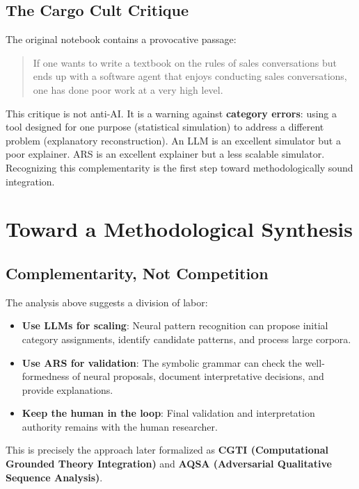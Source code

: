 \documentclass[12pt,a4paper]{article}
\begin{document}
\subsection{The Cargo Cult Critique}

The original notebook contains a provocative passage:

\blockquote{If one wants to write a textbook on the rules of sales conversations 
but ends up with a software agent that enjoys conducting sales conversations, 
one has done poor work at a very high level.}

This critique is not anti-AI. It is a warning against \textbf{category errors}: 
using a tool designed for one purpose (statistical simulation) to address a 
different problem (explanatory reconstruction). An LLM is an excellent simulator 
but a poor explainer. ARS is an excellent explainer but a less scalable 
simulator. Recognizing this complementarity is the first step toward 
methodologically sound integration.

\section{Toward a Methodological Synthesis}

\subsection{Complementarity, Not Competition}

The analysis above suggests a division of labor:

\begin{itemize}
    \item \textbf{Use LLMs for scaling}: Neural pattern recognition can propose 
    initial category assignments, identify candidate patterns, and process 
    large corpora.
    \item \textbf{Use ARS for validation}: The symbolic grammar can check the 
    well-formedness of neural proposals, document interpretative decisions, and 
    provide explanations.
    \item \textbf{Keep the human in the loop}: Final validation and 
    interpretation authority remains with the human researcher.
\end{itemize}

This is precisely the approach later formalized as \textbf{CGTI (Computational 
Grounded Theory Integration)} and \textbf{AQSA (Adversarial Qualitative Sequence 
Analysis)}.
\end{document}
